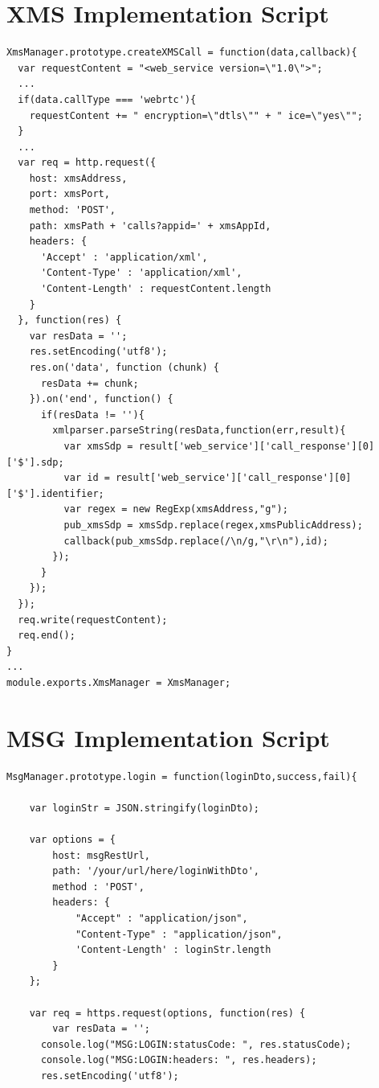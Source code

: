\begin{appendices}
\section{XMS Implementation Script}
\label{server:xms}

\begin{lstlisting}[caption={xms.js on Application Server},label={code:xms}]
XmsManager.prototype.createXMSCall = function(data,callback){
  var requestContent = "<web_service version=\"1.0\">";
  ...
  if(data.callType === 'webrtc'){
    requestContent += " encryption=\"dtls\"" + " ice=\"yes\"";
  }
  ...
  var req = http.request({
    host: xmsAddress,
    port: xmsPort,
    method: 'POST',
    path: xmsPath + 'calls?appid=' + xmsAppId,
    headers: {
      'Accept' : 'application/xml',
      'Content-Type' : 'application/xml',
      'Content-Length' : requestContent.length
    }
  }, function(res) {
    var resData = '';
    res.setEncoding('utf8');
    res.on('data', function (chunk) {
      resData += chunk;
    }).on('end', function() {
      if(resData != ''){
        xmlparser.parseString(resData,function(err,result){
          var xmsSdp = result['web_service']['call_response'][0]['$'].sdp;
          var id = result['web_service']['call_response'][0]['$'].identifier;
          var regex = new RegExp(xmsAddress,"g");
          pub_xmsSdp = xmsSdp.replace(regex,xmsPublicAddress);
          callback(pub_xmsSdp.replace(/\n/g,"\r\n"),id);
        });
      }
    });
  });
  req.write(requestContent);
  req.end();
}
...
module.exports.XmsManager = XmsManager;
\end{lstlisting}

\section{MSG Implementation Script}
\label{server:msg}

\begin{lstlisting}[caption={msg.js on Application Server},label={code:msg}]
MsgManager.prototype.login = function(loginDto,success,fail){

	var loginStr = JSON.stringify(loginDto);

	var options = {
		host: msgRestUrl,
		path: '/your/url/here/loginWithDto',
		method : 'POST',
		headers: {
			"Accept" : "application/json",
			"Content-Type" : "application/json",
			'Content-Length' : loginStr.length
		}
	};

	var req = https.request(options, function(res) {
		var resData = '';
	  console.log("MSG:LOGIN:statusCode: ", res.statusCode);
	  console.log("MSG:LOGIN:headers: ", res.headers);
	  res.setEncoding('utf8');


\end{lstlisting}
\end{appendices}
